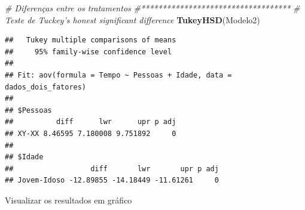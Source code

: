 \documentclass[
]{book}
\newenvironment{Shaded}{\begin{snugshade}}{\end{snugshade}}
\newcommand{\CommentTok}[1]{\textcolor[rgb]{0.56,0.35,0.01}{\textit{#1}}}
\newcommand{\KeywordTok}[1]{\textcolor[rgb]{0.13,0.29,0.53}{\textbf{#1}}}
\newcommand{\NormalTok}[1]{#1}
\begin{document}
\begin{Shaded}
\begin{Highlighting}[]
\CommentTok{# Diferenças entre os tratamentos}
\CommentTok{#***********************************}
\CommentTok{# Teste de Tuckey's honest significant difference}
\KeywordTok{TukeyHSD}\NormalTok{(Modelo2)}
\end{Highlighting}
\end{Shaded}

\begin{verbatim}
##   Tukey multiple comparisons of means
##     95% family-wise confidence level
## 
## Fit: aov(formula = Tempo ~ Pessoas + Idade, data = dados_dois_fatores)
## 
## $Pessoas
##          diff      lwr      upr p adj
## XY-XX 8.46595 7.180008 9.751892     0
## 
## $Idade
##                  diff       lwr       upr p adj
## Jovem-Idoso -12.89855 -14.18449 -11.61261     0
\end{verbatim}

Visualizar os resultados em gráfico
\end{document}
